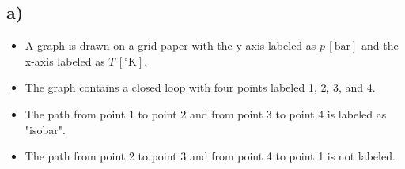 

\subsection*{a)}

\begin{itemize}
    \item A graph is drawn on a grid paper with the y-axis labeled as $p \, [\text{bar}]$ and the x-axis labeled as $T \, [^\circ \text{K}]$.
    \item The graph contains a closed loop with four points labeled 1, 2, 3, and 4.
    \item The path from point 1 to point 2 and from point 3 to point 4 is labeled as "isobar".
    \item The path from point 2 to point 3 and from point 4 to point 1 is not labeled.
\end{itemize}